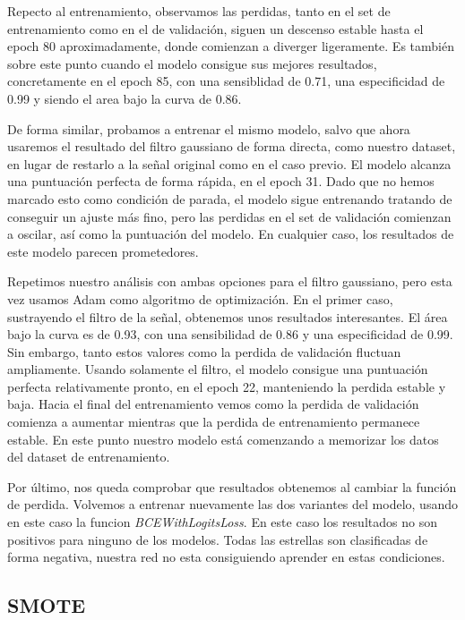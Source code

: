 Repecto al entrenamiento, observamos las perdidas, tanto en el set de entrenamiento como en el de validación, siguen un descenso estable hasta el epoch 80 aproximadamente, donde comienzan a diverger ligeramente. Es también sobre este punto cuando el modelo consigue sus mejores resultados, concretamente en el epoch 85, con una sensiblidad de 0.71, una especificidad de 0.99 y siendo el area bajo la curva de 0.86.


De forma similar, probamos a entrenar el mismo modelo, salvo que ahora usaremos el resultado del filtro gaussiano de forma directa, como nuestro dataset, en lugar de restarlo a la señal original como en el caso previo. El modelo alcanza una puntuación perfecta de forma rápida, en el epoch 31. Dado que no hemos marcado esto como condición de parada, el modelo sigue entrenando tratando de conseguir un ajuste más fino, pero las perdidas en el set de validación comienzan a oscilar, así como la puntuación del modelo. En cualquier caso, los resultados de este modelo parecen prometedores.

Repetimos nuestro análisis con ambas opciones para el filtro gaussiano, pero esta vez usamos Adam como algoritmo de optimización. En el primer caso, sustrayendo el filtro de la señal, obtenemos unos resultados interesantes. El área bajo la curva es de 0.93, con una sensibilidad de 0.86 y una especificidad de 0.99. Sin embargo, tanto estos valores como la perdida de validación fluctuan ampliamente. Usando solamente el filtro, el modelo consigue una puntuación perfecta relativamente pronto, en el epoch 22, manteniendo la perdida estable y baja. Hacia el final del entrenamiento vemos como la perdida de validación comienza a aumentar mientras que la perdida de entrenamiento permanece estable. En este punto nuestro modelo está comenzando a memorizar los datos del dataset de entrenamiento.

Por último, nos queda comprobar que resultados obtenemos al cambiar la función de perdida. Volvemos a entrenar nuevamente las dos variantes del modelo, usando en este caso la funcion \textit{BCEWithLogitsLoss}. En este caso los resultados no son positivos para ninguno de los modelos. Todas las estrellas son clasificadas de forma negativa, nuestra red no esta consiguiendo aprender en estas condiciones. 

\subsection{SMOTE}

